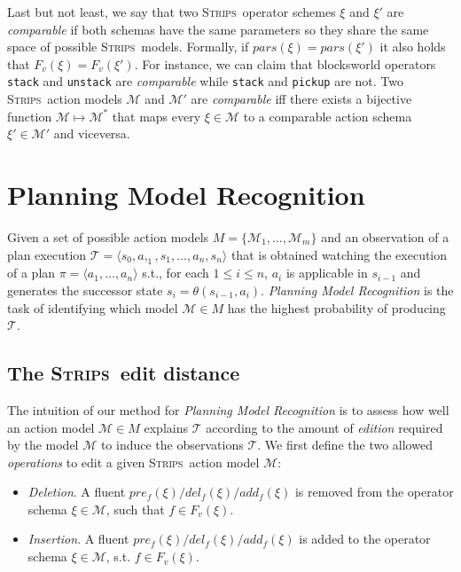 \documentclass[letterpaper]{article} %
\newcommand{\tup}[1]{{\langle #1 \rangle}}
\newcommand{\strips}{\textsc{Strips}}     %
\begin{document}
Last but not least, we say that two \strips\ operator schemes $\xi$ and $\xi'$ are {\em comparable} if both schemas have the same parameters so they share the same space of possible \strips\ models. Formally, if $pars(\xi)=pars(\xi')$ it also holds that $F_v(\xi)=F_v(\xi')$. For instance, we can claim that blocksworld operators {\tt stack} and {\tt unstack} are {\em comparable} while  {\tt stack} and {\tt pickup} are not. Two \strips\ action models $\mathcal{M}$ and $\mathcal{M}'$ are {\em comparable} iff there exists a bijective function $\mathcal{M} \mapsto \mathcal{M}^*$ that maps every $\xi\in\mathcal{M}$ to a comparable action schema $\xi'\in\mathcal{M'}$ and viceversa.


\section{Planning Model Recognition}
\label{sec:section4}
Given a set of possible action models $M=\{\mathcal{M}_1,\ldots,\mathcal{M}_m\}$ and an observation of a plan execution $\mathcal{T}=\tup{s_0,a,_1,s_1,\ldots,a_n,s_{n}}$ that is obtained watching the execution of a plan $\pi=\tup{a_1, \ldots, a_n}$ s.t., for each {\small $1\leq i\leq n$}, $a_i$ is applicable in $s_{i-1}$ and generates the successor state $s_i=\theta(s_{i-1},a_i)$. {\em Planning Model Recognition} is the task of identifying which model $\mathcal{M}\in M$ has the highest probability of producing $\mathcal{T}$.

\subsection{The \strips\ edit distance}
The intuition of our method for {\em Planning Model Recognition} is to assess how well an action model $\mathcal{M}\in M$ explains $\mathcal{T}$ according to the amount of {\em edition} required by the model $\mathcal{M}$ to induce the observations $\mathcal{T}$. We first define the two allowed \emph{operations} to edit a given \strips\ action model $\mathcal{M}$:
\begin{itemize}
\item {\em Deletion}. A fluent $pre_f(\xi)/del_f(\xi)/add_f(\xi)$ is removed from the operator schema $\xi\in\mathcal{M}$, such that $f\in F_v(\xi)$.
\item {\em Insertion}. A fluent $pre_f(\xi)/del_f(\xi)/add_f(\xi)$ is added to the operator schema $\xi\in\mathcal{M}$, s.t. $f\in F_v(\xi)$.
\end{itemize}
\end{document}
